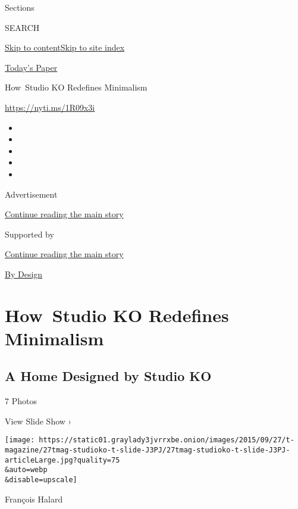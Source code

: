 Sections

SEARCH

\protect\hyperlink{site-content}{Skip to
content}\protect\hyperlink{site-index}{Skip to site index}

\href{https://myaccount.nytimes3xbfgragh.onion/auth/login?response_type=cookie\&client_id=vi}{}

\href{https://www.nytimes3xbfgragh.onion/section/todayspaper}{Today's
Paper}

How~Studio KO Redefines Minimalism

\url{https://nyti.ms/1R09x3i}

\begin{itemize}
\item
\item
\item
\item
\item
\end{itemize}

Advertisement

\protect\hyperlink{after-top}{Continue reading the main story}

Supported by

\protect\hyperlink{after-sponsor}{Continue reading the main story}

\href{/column/by-design}{By Design}

\hypertarget{how-studio-ko-redefines-minimalism}{%
\section{How~Studio KO Redefines
Minimalism}\label{how-studio-ko-redefines-minimalism}}

\href{https://www.nytimes3xbfgragh.onion/slideshow/2015/09/27/t-magazine/a-home-designed-by-studio-ko.html}{}

\hypertarget{a-home-designed-by-studio-ko}{%
\subsection{A Home Designed by Studio
KO}\label{a-home-designed-by-studio-ko}}

7 Photos

View Slide Show ›

\texttt{[image: https://static01.graylady3jvrrxbe.onion/images/2015/09/27/t-magazine/27tmag-studioko-t-slide-J3PJ/27tmag-studioko-t-slide-J3PJ-articleLarge.jpg?quality=75\\\&auto=webp\\\&disable=upscale]}

François Halard

